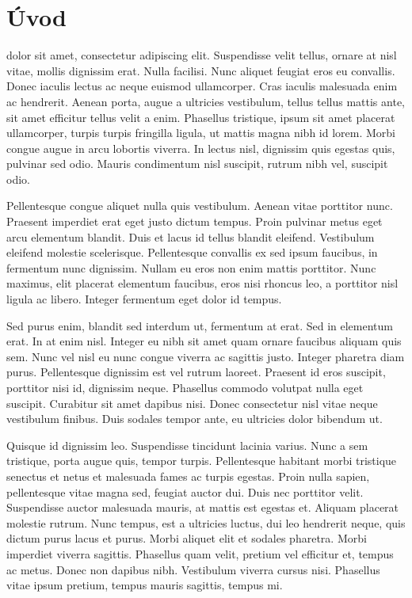 \chapter*{Úvod} %
 dolor sit amet, consectetur adipiscing elit. Suspendisse velit tellus, ornare at nisl vitae, mollis dignissim erat. Nulla facilisi. Nunc aliquet feugiat eros eu convallis. Donec iaculis lectus ac neque euismod ullamcorper. Cras iaculis malesuada enim ac hendrerit. Aenean porta, augue a ultricies vestibulum, tellus tellus mattis ante, sit amet efficitur tellus velit a enim. Phasellus tristique, ipsum sit amet placerat ullamcorper, turpis turpis fringilla ligula, ut mattis magna nibh id lorem. Morbi congue augue in arcu lobortis viverra. In lectus nisl, dignissim quis egestas quis, pulvinar sed odio. Mauris condimentum nisl suscipit, rutrum nibh vel, suscipit odio.

Pellentesque congue aliquet nulla quis vestibulum. Aenean vitae porttitor nunc. Praesent imperdiet erat eget justo dictum tempus. Proin pulvinar metus eget arcu elementum blandit. Duis et lacus id tellus blandit eleifend. Vestibulum eleifend molestie scelerisque. Pellentesque convallis ex sed ipsum faucibus, in fermentum nunc dignissim. Nullam eu eros non enim mattis porttitor. Nunc maximus, elit placerat elementum faucibus, eros nisi rhoncus leo, a porttitor nisl ligula ac libero. Integer fermentum eget dolor id tempus.

Sed purus enim, blandit sed interdum ut, fermentum at erat. Sed in elementum erat. In at enim nisl. Integer eu nibh sit amet quam ornare faucibus aliquam quis sem. Nunc vel nisl eu nunc congue viverra ac sagittis justo. Integer pharetra diam purus. Pellentesque dignissim est vel rutrum laoreet. Praesent id eros suscipit, porttitor nisi id, dignissim neque. Phasellus commodo volutpat nulla eget suscipit. Curabitur sit amet dapibus nisi. Donec consectetur nisl vitae neque vestibulum finibus. Duis sodales tempor ante, eu ultricies dolor bibendum ut.

Quisque id dignissim leo. Suspendisse tincidunt lacinia varius. Nunc a sem tristique, porta augue quis, tempor turpis. Pellentesque habitant morbi tristique senectus et netus et malesuada fames ac turpis egestas. Proin nulla sapien, pellentesque vitae magna sed, feugiat auctor dui. Duis nec porttitor velit. Suspendisse auctor malesuada mauris, at mattis est egestas et. Aliquam placerat molestie rutrum. Nunc tempus, est a ultricies luctus, dui leo hendrerit neque, quis dictum purus lacus et purus. Morbi aliquet elit et sodales pharetra. Morbi imperdiet viverra sagittis. Phasellus quam velit, pretium vel efficitur et, tempus ac metus. Donec non dapibus nibh. Vestibulum viverra cursus nisi. Phasellus vitae ipsum pretium, tempus mauris sagittis, tempus mi.

